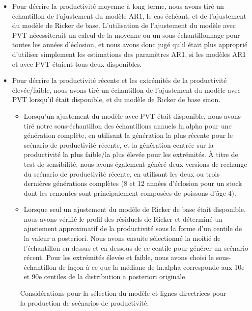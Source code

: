 \documentclass[french,11pt]{book}
\begin{document}
\begin{itemize}

\item
  Pour décrire la productivité moyenne à long terme, nous avons tiré un échantillon de l'ajustement du modèle AR1, le cas échéant, et de l'ajustement du modèle de Ricker de base. L'utilisation de l'ajustement du modèle avec PVT nécessiterait un calcul de la moyenne ou un sous-échantillonnage pour toutes les années d'éclosion, et nous avons donc jugé qu'il était plus approprié d'utiliser simplement les estimations des paramètres AR1, si les modèles AR1 et avec PVT étaient tous deux disponibles.
\item
  Pour décrire la productivité récente et les extrémités de la productivité élevée/faible, nous avons tiré un échantillon de l'ajustement du modèle avec PVT lorsqu'il était disponible, et du modèle de Ricker de base sinon.
  \begin{itemize}

  \item
    Lorsqu'un ajustement du modèle avec PVT était disponible, nous avons tiré notre sous-échantillon des échantillons annuels ln.alpha pour une génération complète, en utilisant la génération la plus récente pour le scénario de productivité récente, et la génération centrée sur la productivité la plus faible/la plus élevée pour les extrémités. À titre de test de sensibilité, nous avons également généré deux versions de rechange du scénario de productivité récente, en utilisant les deux ou trois dernières générations complètes (8 et 12 années d'éclosion pour un stock dont les remontes sont principalement composées de poissons d'âge 4).
  \item
    Lorsque seul un ajustement du modèle de Ricker de base était disponible, nous avons vérifié le profil des résiduels de Ricker et déterminé un ajustement approximatif de la productivité sous la forme d'un centile de la valeur a posteriori. Nous avons ensuite sélectionné la moitié de l'échantillon en dessus et en dessous de ce centile pour générer un scénario récent. Pour les extrémités élevée et faible, nous avons choisi le sous-échantillon de façon à ce que la médiane de ln.alpha corresponde aux 10e et 90e centiles de la distribution a posteriori originale.
  \end{itemize}
\end{itemize}
\clearpage


\begin{figure}[htb]

{\centering {} 

}

\caption{Considérations pour la sélection du modèle et lignes directrices pour la production de scénarios de productivité.}\label{fig:ModelSelection}
\end{figure}
\clearpage
\end{document}

